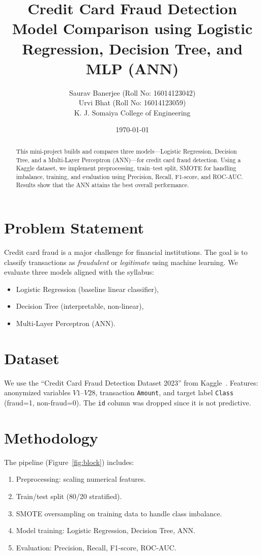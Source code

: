 \documentclass[11pt,a4paper]{article}
\title{\textbf{Credit Card Fraud Detection}\\
\large Model Comparison using Logistic Regression, Decision Tree, and MLP (ANN)}
\author{Saurav Banerjee (Roll No: 16014123042) \\
Urvi Bhat (Roll No: 16014123059) \\
K. J. Somaiya College of Engineering}
\date{\today}
\begin{document}
\maketitle

\begin{abstract}
This mini-project builds and compares three models---Logistic Regression, Decision Tree, and a Multi-Layer Perceptron (ANN)---for credit card fraud detection. Using a Kaggle dataset, we implement preprocessing, train--test split, SMOTE for handling imbalance, training, and evaluation using Precision, Recall, F1-score, and ROC-AUC. Results show that the ANN attains the best overall performance.
\end{abstract}

\section{Problem Statement}
Credit card fraud is a major challenge for financial institutions. The goal is to classify transactions as \emph{fraudulent} or \emph{legitimate} using machine learning. We evaluate three models aligned with the syllabus:
\begin{itemize}
    \item Logistic Regression (baseline linear classifier),
    \item Decision Tree (interpretable, non-linear),
    \item Multi-Layer Perceptron (ANN).
\end{itemize}

\section{Dataset}
We use the ``Credit Card Fraud Detection Dataset 2023'' from Kaggle~\cite{dataset}.  
Features: anonymized variables $V1$--$V28$, transaction \texttt{Amount}, and target label \texttt{Class} (fraud=1, non-fraud=0).  
The \texttt{id} column was dropped since it is not predictive.

\section{Methodology}
The pipeline (Figure~\ref{fig:block}) includes:
\begin{enumerate}
    \item Preprocessing: scaling numerical features.
    \item Train/test split (80/20 stratified).
    \item SMOTE oversampling on training data to handle class imbalance.
    \item Model training: Logistic Regression, Decision Tree, ANN.
    \item Evaluation: Precision, Recall, F1-score, ROC-AUC.
\end{enumerate}
\end{document}
